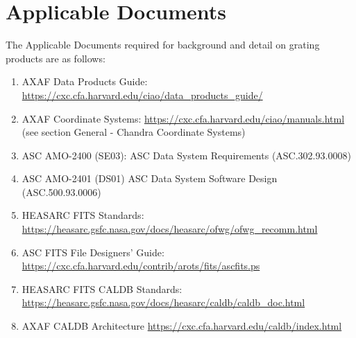 \documentclass[twoside]{article}
\begin{document}
\section{Applicable Documents}
The Applicable Documents required for background and detail on
grating products are as follows:
\begin{enumerate}

\item\label{appdoc:data-prod}
  AXAF Data Products Guide:\newline
  \url{https://cxc.cfa.harvard.edu/ciao/data_products_guide/}
\item\label{appdoc:coord}
  AXAF Coordinate Systems:\newline
  \url{https://cxc.cfa.harvard.edu/ciao/manuals.html} (see section General - Chandra Coordinate Systems)
\item\label{appdoc:se03}
 ASC AMO-2400 (SE03):\newline
 ASC Data System Requirements (ASC.302.93.0008)
\item\label{appdoc:ds01}
 ASC AMO-2401 (DS01) \newline
 ASC Data System Software Design (ASC.500.93.0006)
\item\label{appdoc:fitsstd}
  HEASARC FITS Standards:\newline
  \url{https://heasarc.gsfc.nasa.gov/docs/heasarc/ofwg/ofwg_recomm.html}
\item\label{appdoc:ascfits}
  ASC FITS File Designers' Guide:\newline
  \url{https://cxc.cfa.harvard.edu/contrib/arots/fits/ascfits.ps}
\item\label{appdoc:heasarccaldb}
  HEASARC FITS CALDB Standards:\newline
  \url{https://heasarc.gsfc.nasa.gov/docs/heasarc/caldb/caldb_doc.html}
\item\label{appdoc:asccaldb}
  AXAF CALDB Architecture\newline
  \url{https://cxc.cfa.harvard.edu/caldb/index.html}
\end{enumerate}

%
%
\end{document}

